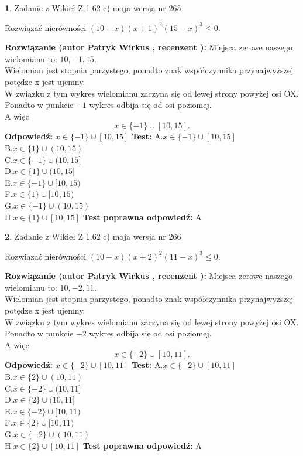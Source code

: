 \documentclass[12pt, a4paper]{article}
\theoremstyle{definition} %
\newtheorem{zad}{}
\newcommand{\zadStart}[1]{\begin{zad}#1\newline}
\newcommand{\zadStop}{\end{zad}}
\newcommand{\rozwStart}[2]{\noindent \textbf{Rozwiązanie (autor #1 , recenzent #2): }\newline}
\newcommand{\rozwStop}{\newline}
\newcommand{\odpStart}{\noindent \textbf{Odpowiedź:}\newline}
\newcommand{\odpStop}{\newline}
\newcommand{\testStart}{\noindent \textbf{Test:}\newline}
\newcommand{\testStop}{\newline}
\newcommand{\kluczStart}{\noindent \textbf{Test poprawna odpowiedź:}\newline}
\newcommand{\kluczStop}{\newline}
\begin{document}
\zadStart{Zadanie z Wikieł Z 1.62 c) moja wersja nr 265}

Rozwiązać nierówności $(10-x)(x+1)^{2}(15-x)^{3}\le0$.
\zadStop
\rozwStart{Patryk Wirkus}{}
Miejsca zerowe naszego wielomianu to: $10, -1, 15$.\\
Wielomian jest stopnia parzystego, ponadto znak współczynnika przy\linebreak najwyższej potędze x jest ujemny.\\ W związku z tym wykres wielomianu zaczyna się od lewej strony powyżej osi OX.\\
Ponadto w punkcie $-1$ wykres odbija się od osi poziomej.\\
A więc $$x \in \{-1\} \cup [10,15].$$
\rozwStop
\odpStart
$x \in \{-1\} \cup [10,15]$
\odpStop
\testStart
A.$x \in \{-1\} \cup [10,15]$\\
B.$x \in \{1\} \cup (10,15)$\\
C.$x \in \{-1\} \cup (10,15]$\\
D.$x \in \{1\} \cup (10,15]$\\
E.$x \in \{-1\} \cup [10,15)$\\
F.$x \in \{1\} \cup [10,15)$\\
G.$x \in \{-1\} \cup (10,15)$\\
H.$x \in \{1\} \cup [10,15]$
\testStop
\kluczStart
A
\kluczStop



\zadStart{Zadanie z Wikieł Z 1.62 c) moja wersja nr 266}

Rozwiązać nierówności $(10-x)(x+2)^{2}(11-x)^{3}\le0$.
\zadStop
\rozwStart{Patryk Wirkus}{}
Miejsca zerowe naszego wielomianu to: $10, -2, 11$.\\
Wielomian jest stopnia parzystego, ponadto znak współczynnika przy\linebreak najwyższej potędze x jest ujemny.\\ W związku z tym wykres wielomianu zaczyna się od lewej strony powyżej osi OX.\\
Ponadto w punkcie $-2$ wykres odbija się od osi poziomej.\\
A więc $$x \in \{-2\} \cup [10,11].$$
\rozwStop
\odpStart
$x \in \{-2\} \cup [10,11]$
\odpStop
\testStart
A.$x \in \{-2\} \cup [10,11]$\\
B.$x \in \{2\} \cup (10,11)$\\
C.$x \in \{-2\} \cup (10,11]$\\
D.$x \in \{2\} \cup (10,11]$\\
E.$x \in \{-2\} \cup [10,11)$\\
F.$x \in \{2\} \cup [10,11)$\\
G.$x \in \{-2\} \cup (10,11)$\\
H.$x \in \{2\} \cup [10,11]$
\testStop
\kluczStart
A
\kluczStop
\end{document}
